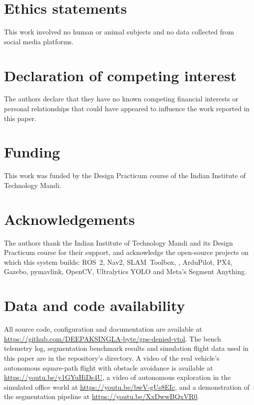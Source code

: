 \section*{Ethics statements}
This work involved no human or animal subjects and no data collected from social media
platforms.

\section*{Declaration of competing interest}
The authors declare that they have no known competing financial interests or
personal relationships that could have appeared to influence the work reported in this
paper.

\section*{Funding}
This work was funded by the Design Practicum course of the Indian Institute of
Technology Mandi.

\section*{Acknowledgements}
The authors thank the Indian Institute of Technology Mandi and its Design Practicum
course for their support, and acknowledge the open-source projects on which this system builds:
ROS~2, Nav2, SLAM~Toolbox, , ArduPilot, PX4, Gazebo, pymavlink,
OpenCV, Ultralytics YOLO and Meta's Segment Anything.

\section*{Data and code availability}
All source code, configuration and documentation are available at
\url{https://github.com/DEEPAKSINGLA-byte/gps-denied-vtol}. The bench telemetry log,
segmentation benchmark results and simulation flight data used in this paper are in the
repository's  directory. A video of the real vehicle's autonomous square-path flight with obstacle avoidance is
available at \url{https://youtu.be/y1GYuHiDs4U}, a video of autonomous exploration in
the simulated office world at \url{https://youtu.be/bwV-gUs8EIc}, and a demonstration of the
segmentation pipeline at \url{https://youtu.be/XxDwwBQxVR0}.
